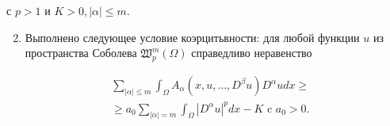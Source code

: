 \documentclass[10pt]{article}
\begin{document}
с $p>1$ и $K>0,|\alpha| \leqslant m$.



\begin{enumerate}

  \setcounter{enumi}{1}

  \item Выполнено следующее условие коэрцитьвности: для любой функции $u$ из пространства Соболева $\mathfrak{W}_{p}^{m}(\Omega)$ справедливо неравенство

\end{enumerate}



\[

\begin{aligned}

& \sum_{|\alpha| \leqslant m} \int_{\Omega} A_{\alpha}\left(x, u, \ldots, D^{\beta} u\right) D^{\alpha} u d x \geqslant \\

& \geqslant a_{0} \sum_{|\alpha|=m} \int_{\Omega}\left|D^{\alpha} u\right|^{p} d x-K \text { c } a_{0}>0 .

\end{aligned}

\]
\end{document}

